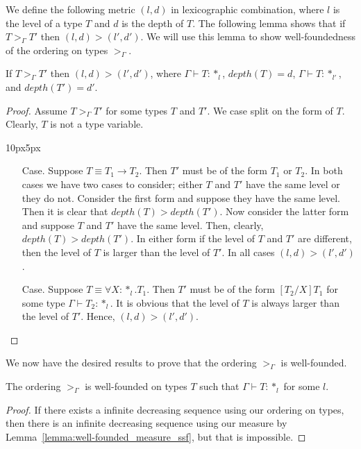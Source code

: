 We define the following metric $(l,d)$ in lexicographic combination,
where $l$ is the level of a type $T$ and $d$ is the depth of
$T$.  The following lemma shows that if $T >_\Gamma T'$ then
$(l,d) > (l',d')$.  We will use this lemma to show well-foundedness of
the ordering on types $>_\Gamma$.  

\begin{lemma}
  \label{lemma:well-founded_measure_ssf}
  If $T >_\Gamma T'$ then $(l,d) > (l',d')$, where $\Gamma \vdash T:*_l$, 
  $depth(T) = d$,  $\Gamma \vdash T:*_{l'}$, and $depth(T') = d'$.
\end{lemma}
\begin{proof}
  Assume $T >_\Gamma T'$ for some types $T$ and $T'$.  We case split on
  the form of $T$.  Clearly, $T$ is not a type variable.
  \vspace{-25px}
  \begin{changemargin}{10px}{5px}\noindent
  \begin{itemize}
  \item[Case.]  Suppose $T \equiv T_1 \to T_2$.  Then $T'$ must be of the 
    form $T_1$ or $T_2$.  In both
    cases we have two cases to
    consider; either $T$ and $T'$ have the same level or they do not.  Consider the
    first form and suppose they have the same level.  Then it is clear that 
    $depth(T) > depth(T')$.  Now consider the latter form and suppose
    $T$ and $T'$ have the same level.  Then, clearly, $depth(T) > depth(T')$.  
    In either form if the level of $T$ and $T'$ are different, then the level of 
    $T$ is larger than the level of $T'$.  In all cases $(l,d) > (l',d')$.
    
  \item[Case.] Suppose $T \equiv \forall X:*_l.T_1$.  Then $T'$ must be of the
    form $[T_2/X]T_1$ for some type $\Gamma \vdash T_2:*_l$.  It is obvious that
    the level of $T$ is always larger than the level of $T'$.  Hence, $(l,d) > (l',d')$.
  \end{itemize}
  \end{changemargin}
\end{proof}
\noindent We now have the desired results to prove that the ordering $>_\Gamma$ is 
well-founded.

\begin{thm}
  The ordering $>_\Gamma$ is well-founded on types $T$ such that 
  $\Gamma \vdash T:*_l$ for some $l$.
  \label{thm:well-founded_ordering_ssf}
\end{thm}
\begin{proof}
  If there exists a infinite decreasing sequence using our ordering on types,
  then there is an infinite decreasing sequence using our measure by 
  Lemma~\ref{lemma:well-founded_measure_ssf}, but that is impossible.
\end{proof}

